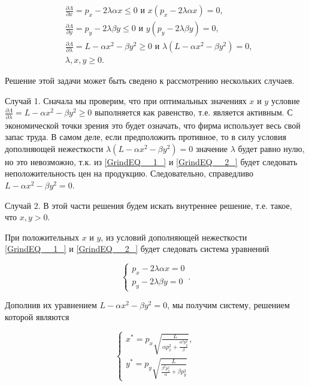 \begin{problem}
\begin{sol}
\begin{align}
\label{GrindEQ__1_} & \frac{\partial \Lambda }{\partial x} =p_{x} -2\lambda \alpha x\le 0 \text{ и } x(p_{x} -2\lambda \alpha x)=0, \\
\label{GrindEQ__2_}  & \frac{\partial \Lambda }{\partial y} =p_{y} -2\lambda \beta y\le 0 \text{ и } y(p_{y} -2\lambda \beta y)=0, \\
\label{GrindEQ__3_}  & \frac{\partial \Lambda }{\partial \lambda } =L-\alpha x^{2} -\beta y^{2} \ge 0 \text{ и } \lambda (L-\alpha x^{2} -\beta y^{2} )=0, \\
\label{GrindEQ__4_}  & \lambda ,x,y\ge 0.
\end{align}


Решение этой задачи может быть сведено к рассмотрению нескольких случаев.

Случай 1. Сначала мы проверим, что при оптимальных значениях $x$ и $y$ условие $\frac{\partial \Lambda }{\partial \lambda } =L-\alpha x^{2} -\beta y^{2} \ge 0$ выполняется как равенство, т.е. является активным. С экономической точки зрения это будет означать, что фирма использует весь свой запас труда. В самом деле, если предположить противное, то в силу условия дополняющей нежесткости $\lambda (L-\alpha x^{2} -\beta y^{2} )=0$ значение $\lambda $ будет равно нулю, но это невозможно, т.к. из \ref{GrindEQ__1_} и \ref{GrindEQ__2_} будет следовать неположительность цен на продукцию. Следовательно, справедливо  $L-\alpha x^{2} -\beta y^{2} =0$.

Случай 2. В этой части решения будем искать внутреннее решение, т.е. такое, что $x,y>0$.

При положительных $x$ и $y$, из условий дополняющей нежесткости \ref{GrindEQ__1_} и \ref{GrindEQ__2_} будет следовать система уравнений

\begin{equation}
\begin{cases}
p_{x} -2\lambda \alpha x=0 \\
p_{y} -2\lambda \beta y=0
\end{cases}.
\end{equation}

Дополнив их уравнением $L-\alpha x^2-\beta y^2=0$, мы получим систему, решением которой являются

\begin{equation} \label{GrindEQ__7_}
\begin{cases}
x^*=p_{x} \sqrt{\frac{L}{\alpha p_{x}^{2} +\frac{\alpha ^{2} p_{y}^{2} }{\beta } } } , \\
y^*=p_{y} \sqrt{\frac{L}{\frac{\beta ^{2} p_{x}^{2} }{\alpha } +\beta p_{y}^{2} } }
\end{cases}
\end{equation}


\end{sol}
\end{problem}
